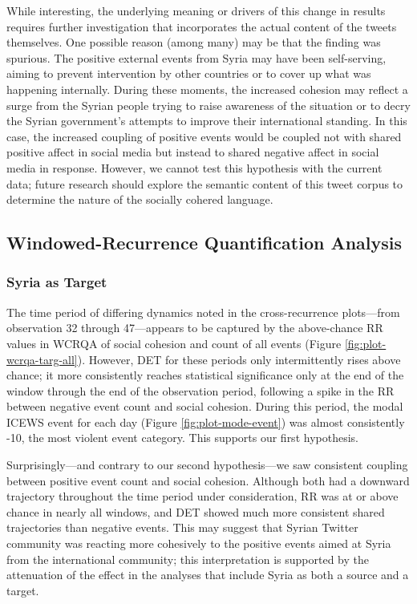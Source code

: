 \documentclass[english,man]{apa6}
\begin{document}
While interesting, the underlying meaning or drivers of this change in results
requires further investigation that incorporates the actual content of the
tweets themselves. One possible reason (among many) may be that the finding was
spurious. The positive external events from Syria may have been self-serving,
aiming to prevent intervention by other countries or to cover up what was
happening internally. During these moments, the increased cohesion may reflect a
surge from the Syrian people trying to raise awareness of the situation or to
decry the Syrian government's attempts to improve their international standing.
In this case, the increased coupling of positive events would be coupled not
with shared positive affect in social media but instead to shared negative
affect in social media in response. However, we cannot test this hypothesis with
the current data; future research should explore the semantic content of this
tweet corpus to determine the nature of the socially cohered language.

\hypertarget{windowed-recurrence-quantification-analysis}{%
\subsection{Windowed-Recurrence Quantification Analysis}\label{windowed-recurrence-quantification-analysis}}

\hypertarget{syria-as-target-3}{%
\subsubsection{Syria as Target}\label{syria-as-target-3}}

The time period of differing dynamics noted in the cross-recurrence plots---from
observation 32 through 47---appears to be captured by the above-chance RR values
in WCRQA of social cohesion and count of all events (Figure
\ref{fig:plot-wcrqa-targ-all}). However, DET for these periods only
intermittently rises above chance; it more consistently reaches statistical
significance only at the end of the window through the end of the observation
period, following a spike in the RR between negative event count and social
cohesion. During this period, the modal ICEWS event for each day (Figure
\ref{fig:plot-mode-event}) was almost consistently -10, the most violent event
category. This supports our first hypothesis.

Surprisingly---and contrary to our second hypothesis---we saw consistent
coupling between positive event count and social cohesion. Although both had a
downward trajectory throughout the time period under consideration, RR was at or
above chance in nearly all windows, and DET showed much more consistent shared
trajectories than negative events. This may suggest that Syrian Twitter
community was reacting more cohesively to the positive events aimed at Syria
from the international community; this interpretation is supported by the
attenuation of the effect in the analyses that include Syria as both a source
and a target.
\end{document}

